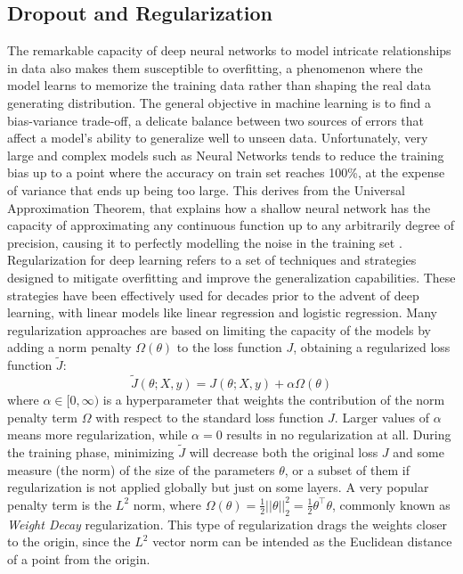 \documentclass[binding=0.7cm, oneside]{sapthesis}
\begin{document}
\subsection{Dropout and Regularization}
The remarkable capacity of deep neural networks to model intricate relationships in data also makes them susceptible to overfitting, a phenomenon where the model learns to memorize the training data rather than shaping the real data generating distribution. The general objective in machine learning is to find a bias-variance trade-off, a delicate balance between two sources of errors that affect a model's ability to generalize well to unseen data. Unfortunately,
very large and complex models such as Neural Networks tends to reduce the training bias up to a point where the accuracy on train set reaches 100\%, at the expense of variance that ends up being too large. This derives from the Universal Approximation Theorem, that explains how a shallow neural network has the capacity of approximating any continuous function up to any arbitrarily degree of precision, causing it to perfectly modelling the noise in the training set \cite{overfitting}.
Regularization for deep learning refers to a set of techniques and strategies designed to mitigate overfitting and improve the generalization capabilities. These strategies have been effectively used for decades prior to the advent of deep learning, with linear models like linear regression and logistic regression. Many regularization approaches are based on limiting the capacity of the models by adding a norm penalty $\Omega(\theta)$ to the loss function $J$, obtaining a regularized
loss function $\tilde{J}$:
$$\tilde{J}(\theta; X, y) = J(\theta; X, y) + \alpha\Omega(\theta)$$
where $\alpha \in [0, \infty)$ is a hyperparameter that weights the contribution of the norm penalty term $\Omega$ with respect to the standard loss function $J$. Larger values of $\alpha$ means more regularization, while $\alpha = 0$ results in no regularization at all.
During the training phase, minimizing $\tilde{J}$ will decrease both the original loss $J$ and some measure (the norm) of the size of the parameters $\theta$, or a subset of them if regularization is not applied globally but just on some layers.
A very popular penalty term is the $L^2$ norm, where $\Omega(\theta) = \frac{1}{2}||\theta||^{2}_{2} = \frac{1}{2}\theta^\top\theta$, commonly known as \emph{Weight Decay} regularization. This type of regularization drags the weights closer to the origin, since the $L^2$ vector norm can be intended as the Euclidean distance of a point from the origin.
\end{document}
